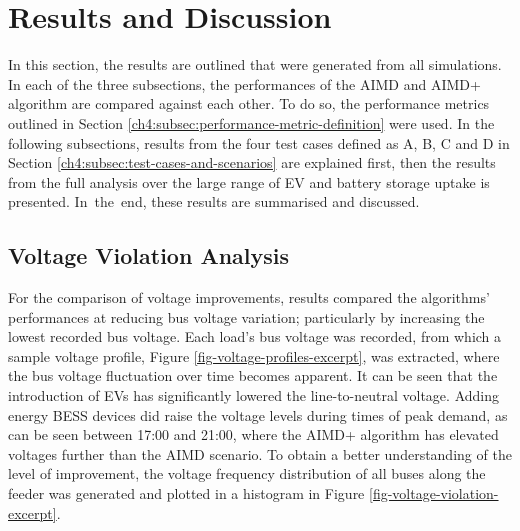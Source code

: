 \section{Results and Discussion}
\label{ch4:sec:results-and-discussion}

In this section, the results are outlined that were generated from all simulations. In each of the three subsections, the performances of the AIMD and AIMD+ algorithm are compared against each other. To do so, the performance metrics outlined in Section \ref{ch4:subsec:performance-metric-definition} were used. In the following subsections, results from the four test cases defined as {A}, {B}, {C} and {D} in Section \ref{ch4:subsec:test-cases-and-scenarios} are explained first, then the results from the full analysis over the large range of EV and battery storage uptake is presented. In~the~end, these results are summarised and discussed.

\subsection{Voltage Violation Analysis}

For the comparison of voltage improvements, results compared the algorithms' performances at reducing bus voltage variation; particularly by increasing the lowest recorded bus voltage. Each load's bus voltage was recorded, from which a sample voltage profile, Figure \ref{fig-voltage-profiles-excerpt}, was extracted, where the bus voltage fluctuation over time becomes apparent. It can be seen that the introduction of EVs has significantly lowered the line-to-neutral voltage. Adding energy BESS devices did raise the voltage levels during times of peak demand, as can be seen between 17:00 and 21:00, where the AIMD+ algorithm has elevated voltages further than the AIMD scenario. To obtain a better understanding of the level of improvement, the voltage frequency distribution of all buses along the feeder was generated and plotted in a histogram in Figure \ref{fig-voltage-violation-excerpt}.

